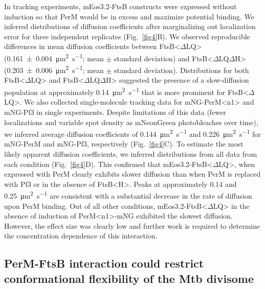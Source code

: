 \documentclass[twocolumn,pdflatex,sn-nature]{sn-jnl}%
\def\textsuperscript#1{<#1>}%
\newcommand\mtb{Mtb}
\newcommand\ftsbH{FtsB\textsuperscript{H}}
\newcommand\ftsbdLQ{FtsB\textsuperscript{$\Delta{}$LQ}}
\newcommand\ftsbdLQdH{FtsB\textsuperscript{$\Delta{}$LQ$\Delta{}$H}}
\newcommand\permN{PerM\textsuperscript{n1}}
\begin{document}
In tracking experiments, mEos3.2-FtsB constructs were expressed without induction so that PerM would be in excess and maximize potential binding.
We inferred distributions of diffusion coefficients after marginalizing out localization error for three independent replicates (Fig.~\ref{fig4}B).
We observed reproducible differences in mean diffusion coefficients between \ftsbdLQ{} (\qty{0.161 +- 0.004}{\square\um\per\s}; mean $\pm$ standard deviation) and \ftsbdLQdH{} (\qty{0.203 +- 0.006}{\square\um\per\s}; mean $\pm$ standard deviation).
Distributions for both \ftsbdLQ{} and \ftsbdLQdH{} suggested the presence of a slow-diffusion population at approximately \qty{0.14}{\square\um\per\s} that is more prominent for \ftsbdLQ{}.
We also collected single-molecule tracking data for mNG-\permN{} and mNG-Pf3 in single experiments.
Despite limitations of this data (fewer localizations and variable spot density as mNeonGreen photobleaches over time), we inferred average diffusion coefficients of \qty{0.144}{\square\um\per\s} and \qty{0.226}{\square\um\per\s} for mNG-PerM and mNG-Pf3, respectively (Fig.~\ref{fig4}C).
To estimate the most likely apparent diffusion coefficients, we inferred distributions from all data from each condition (Fig.~\ref{fig4}D).
This confirmed that mEos3.2-\ftsbdLQ{}, when expressed with PerM clearly exhibits slower diffusion than when PerM is replaced with Pf3 or in the absence of \ftsbH{}.
Peaks at approximately 0.14 and \qty{0.25}{\square\um\per\s} are consistent with a substantial decrease in the rate of diffusion upon PerM binding.
Out of all other conditions, mEos3.2-\ftsbdLQ{} in the absence of induction of \permN{}-mNG exhibited the slowest diffusion.
However, the effect size was clearly low and further work is required to determine the concentration dependence of this interaction.

\subsection{PerM-FtsB interaction could restrict conformational flexibility of the \mtb{} divisome}
\end{document}
